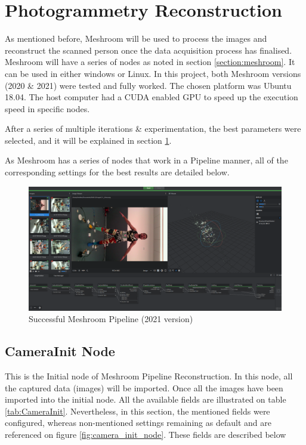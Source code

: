 \documentclass[12pt]{report}
\begin{document}
  
  
  





  \section{Photogrammetry Reconstruction}
  \label{section:meshroom_method}
  As mentioned before, Meshroom will be used to process the images and reconstruct the scanned person once the data acquisition process has finalised. 
  Meshroom will have a series of nodes as noted in section \ref{section:meshroom}. It can be used in either windows or Linux. In this project, both Meshroom versions
  (2020 \& 2021) were tested and fully worked. The chosen platform was Ubuntu 18.04. The host computer had a CUDA enabled GPU  to speed up the execution speed in specific nodes.
  
  After a series of multiple iterations \& experimentation, the best parameters were selected, and it will be explained in section \ref{section:meshroom_method}.
  
  As Meshroom has a series of nodes that work in a Pipeline manner, all of the corresponding settings for the best results are detailed below.
  
  \begin{figure}[H]%
    \centering
   \includegraphics[width=1\textwidth]{meshroom_gui_reconstruction.png}
  \caption{Successful Meshroom Pipeline (2021 version)}
  \label{fig:final_meshroom} 
  \end{figure}
  
  





  \subsection*{CameraInit Node}
  This is the Initial node of Meshroom Pipeline Reconstruction. 
  In this node, all the captured data (images) will be imported.
  Once all the images have been imported into the initial node.
  All the available fields are illustrated on table \ref{tab:CameraInit}. Nevertheless, in this section, the mentioned fields were configured, whereas non-mentioned settings remaining as default and are referenced on figure \ref{fig:camera_init_node}.
  These fields are described below
  
\end{document}
